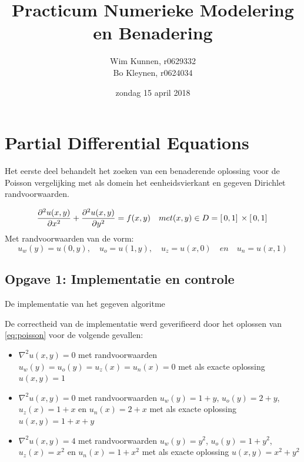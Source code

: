 \documentclass[a4paper]{article}
\title{Practicum Numerieke Modelering en Benadering}
\author{Wim Kunnen, r0629332 \\ Bo Kleynen, r0624034}
\date{zondag 15 april 2018 }
\newcommand{\opgave}[1]{\subsection{Opgave #1}}
\begin{document}
\begin{titlepage}
\maketitle
\thispagestyle{empty}
\end{titlepage}


\setcounter{page}{1}
\tableofcontents
\cleardoublepage

\listoffigures
{}

\listoftables
{}

\lstlistoflistings

\cleardoublepage



\setcounter{page}{1}

\section{Partial Differential Equations}\label{sec:PDE}
Het eerste deel behandelt het zoeken van een benaderende oplossing voor de Poisson vergelijking met als domein het eenheidsvierkant en gegeven Dirichlet randvoorwaarden.

\begin{equation}\label{eq:poisson}
	\pdv[2]{u(x,y)}{x} + \pdv[2]{u(x,y)}{y} = f(x,y) \quad met (x,y) \in D = [ \, 0,1 ]\, \times [ \, 0,1 ]\,
\end{equation}
Met randvoorwaarden van de vorm:
\begin{equation}\nonumber
	u_w(y) = u(0,y), \quad u_o = u(1,y), \quad u_z = u(x,0) \quad en \quad u_n = u(x,1)
\end{equation}



\opgave{1: Implementatie en controle}\label{sec:oef1}
De implementatie van het gegeven algoritme

De correctheid van de implementatie werd geverifieerd door het oplossen van \ref{eq:poisson} voor de volgende gevallen:
\begin{itemize}
	\item $\nabla^2u(x,y)=0$ met randvoorwaarden $u_w(y)=u_o(y)=u_z(x)=u_n(x)=0$ met als exacte oplossing $u(x,y) = 1$
	\item $\nabla^2u(x,y)=0$ met randvoorwaarden $u_w(y)=1+y$, $u_o(y)=2+y$, $u_z(x)=1+x$ en $u_n(x)=2+x$ met als exacte oplossing $u(x,y) = 1 + x + y$
	\item $\nabla^2u(x,y)=4$ met randvoorwaarden $u_w(y)=y^2$, $u_o(y)=1+y^2$, $u_z(x)=x^2$ en $u_n(x)=1+x^2$ met als exacte oplossing $u(x,y) = x^2 +y^2$
\end{itemize}
\end{document}
